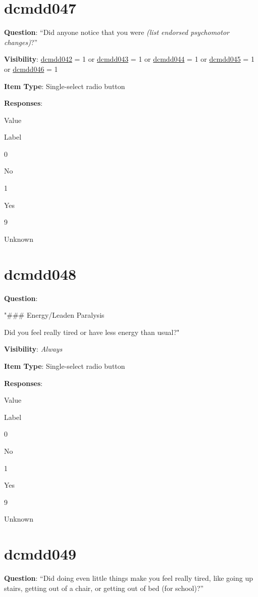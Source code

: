\documentclass[
]{book}
\begin{document}
\hypertarget{dcmdd047}{%
\section{dcmdd047}\label{dcmdd047}}

\textbf{Question}: ``Did anyone notice that you were \emph{(list endorsed psychomotor changes)}?''

\textbf{Visibility}: \protect\hyperlink{dcmdd042}{dcmdd042} = 1 or \protect\hyperlink{dcmdd043}{dcmdd043} = 1 or \protect\hyperlink{dcmdd044}{dcmdd044} = 1 or \protect\hyperlink{dcmdd045}{dcmdd045} = 1 or \protect\hyperlink{dcmdd046}{dcmdd046} = 1

\textbf{Item Type}: Single-select radio button

\textbf{Responses}:

Value

Label

0

No

1

Yes

9

Unknown

\hypertarget{dcmdd048}{%
\section{dcmdd048}\label{dcmdd048}}

\textbf{Question}:

"\#\#\# Energy/Leaden Paralysis

Did you feel really tired or have less energy than usual?"

\textbf{Visibility}: \emph{Always}

\textbf{Item Type}: Single-select radio button

\textbf{Responses}:

Value

Label

0

No

1

Yes

9

Unknown

\hypertarget{dcmdd049}{%
\section{dcmdd049}\label{dcmdd049}}

\textbf{Question}: ``Did doing even little things make you feel really tired, like going up stairs, getting out of a chair, or getting out of bed (for school)?''
\end{document}
